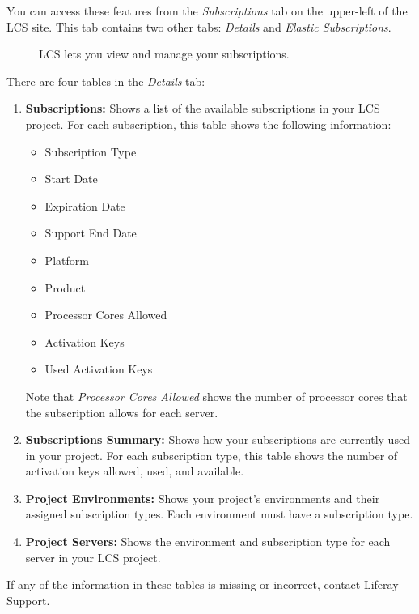 You can access these features from the \emph{Subscriptions} tab on the
upper-left of the LCS site. This tab contains two other tabs:
\emph{Details} and \emph{Elastic Subscriptions}.

\begin{figure}
\centering
{}
\caption{LCS lets you view and manage your subscriptions.}
\end{figure}

There are four tables in the \emph{Details} tab:

\begin{enumerate}
\def\labelenumi{\arabic{enumi}.}
\item
  \textbf{Subscriptions:} Shows a list of the available subscriptions in
  your LCS project. For each subscription, this table shows the
  following information:

  \begin{itemize}
  \tightlist
  \item
    Subscription Type
  \item
    Start Date
  \item
    Expiration Date
  \item
    Support End Date
  \item
    Platform
  \item
    Product
  \item
    Processor Cores Allowed
  \item
    Activation Keys
  \item
    Used Activation Keys
  \end{itemize}

  Note that \emph{Processor Cores Allowed} shows the number of processor
  cores that the subscription allows for each server.
\item
  \textbf{Subscriptions Summary:} Shows how your subscriptions are
  currently used in your project. For each subscription type, this table
  shows the number of activation keys allowed, used, and available.
\item
  \textbf{Project Environments:} Shows your project's environments and
  their assigned subscription types. Each environment must have a
  subscription type.
\item
  \textbf{Project Servers:} Shows the environment and subscription type
  for each server in your LCS project.
\end{enumerate}

If any of the information in these tables is missing or incorrect,
contact Liferay Support.

